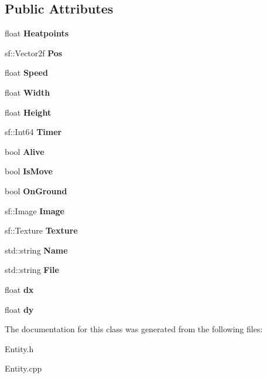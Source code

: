\subsection*{Public Attributes}
\begin{DoxyCompactItemize}
\item 
\mbox{\label{class_entity_a7da0acdf92377bac590ac3fbfb6b496f}} 
float {\bfseries Heatpoints}
\item 
\mbox{\label{class_entity_a906ea40949afeba12aabef52d7b67587}} 
sf\+::\+Vector2f {\bfseries Pos}
\item 
\mbox{\label{class_entity_a8f987588c24a29e6f0d8cdc9dee1a0a7}} 
float {\bfseries Speed}
\item 
\mbox{\label{class_entity_abfa9047e1fe7b824fdd837b127513c14}} 
float {\bfseries Width}
\item 
\mbox{\label{class_entity_a1f6e7c50981f916434f78b614d09da11}} 
float {\bfseries Height}
\item 
\mbox{\label{class_entity_a75b5a55635eb07ca229519553137059f}} 
sf\+::\+Int64 {\bfseries Timer}
\item 
\mbox{\label{class_entity_a9591c4a913f8348715e9a84d957a8b93}} 
bool {\bfseries Alive}
\item 
\mbox{\label{class_entity_a4eeb3d53f6e52112f99145a5cdd7d03d}} 
bool {\bfseries Is\+Move}
\item 
\mbox{\label{class_entity_a2f43af776613b10c5680ea852c78c931}} 
bool {\bfseries On\+Ground}
\item 
\mbox{\label{class_entity_ac6bb4eae35563add00a0512fc7856938}} 
sf\+::\+Image {\bfseries Image}
\item 
\mbox{\label{class_entity_ad2bef26f8eef4c3c1c9f5830a1cc16d9}} 
sf\+::\+Texture {\bfseries Texture}
\item 
\mbox{\label{class_entity_ae8f30f7e882096be1fe49167a16d8611}} 
std\+::string {\bfseries Name}
\item 
\mbox{\label{class_entity_a45a52286e7651da8796110069dd31b4b}} 
std\+::string {\bfseries File}
\item 
\mbox{\label{class_entity_a182c63e0b0bedf2159e47b019d769ec4}} 
float {\bfseries dx}
\item 
\mbox{\label{class_entity_ade4d0d757640434826ba88607f1af535}} 
float {\bfseries dy}
\end{DoxyCompactItemize}


The documentation for this class was generated from the following files\+:\begin{DoxyCompactItemize}
\item 
Entity.\+h\item 
Entity.\+cpp\end{DoxyCompactItemize}
